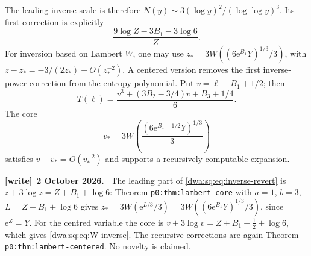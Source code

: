\documentclass[11pt,letterpaper]{article}
\numberwithin{equation}{section}
\theoremstyle{remark}
\newcommand{\e}{\mathrm e}
\newenvironment{writenote}[1][]{\par\smallskip\begingroup\small
 \noindent\textbf{[write]}\if\relax\detokenize{#1}\relax\else~\textbf{#1.}\fi\ }%
 {\par\endgroup\smallskip}
\begin{document}
The leading inverse scale is therefore $N(y)\sim3(\log y)^2/(\log\log y)^3$. Its first correction is explicitly
\[
 \frac{9\log Z-3B_1-3\log6}{Z}.
\]
For inversion based on Lambert $W$, one may use $z_*=3W((6\e^{B_1}Y)^{1/3}/3)$, with $z-z_*=-3/(2z_*)+O(z_*^{-2})$. A centered version removes the first inverse-power correction from the entropy polynomial. Put $v=\ell+B_1+1/2$; then
\[
 T(\ell)=\frac{v^3+(3B_2-3/4)v+B_3+1/4}{6}.
\]
The core
\begin{equation}\label{dwa:sq:eq:W-inverse}
 v_*=3W\left(\frac{(6\e^{B_1+1/2}Y)^{1/3}}3\right)
\end{equation}
satisfies $v-v_*=O(v_*^{-2})$ and supports a recursively computable expansion.
\begin{writenote}[2 October 2026]
The leading part of \eqref{dwa:sq:eq:inverse-revert} is $z+3\log z=Z+B_1+\log6$: Theorem \texttt{p0:thm:lambert-core} with $a=1$, $b=3$, $L=Z+B_1+\log6$ gives $z_*=3W(\e^{L/3}/3)=3W((6\e^{B_1}Y)^{1/3}/3)$, since $\e^Z=Y$. For the centred variable the core is $v+3\log v=Z+B_1+\frac12+\log6$, which gives \eqref{dwa:sq:eq:W-inverse}. The recursive corrections are again Theorem \texttt{p0:thm:lambert-centered}. No novelty is claimed.
\end{writenote}
\end{document}
